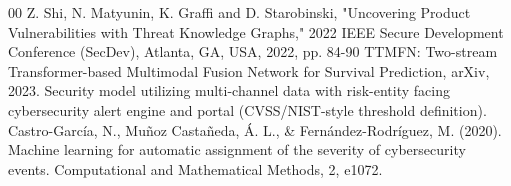 \documentclass[conference]{IEEEtran}
\begin{document}
\begin{thebibliography}{00}
Z. Shi, N. Matyunin, K. Graffi and D. Starobinski, "Uncovering Product Vulnerabilities with Threat Knowledge Graphs," 2022 IEEE Secure Development Conference (SecDev), Atlanta, GA, USA, 2022, pp. 84-90
TTMFN: Two-stream Transformer-based Multimodal Fusion Network for Survival Prediction, arXiv, 2023.
Security model utilizing multi-channel data with risk-entity facing cybersecurity alert engine and portal (CVSS/NIST-style threshold definition).
Castro-García, N., Muñoz Castañeda, Á. L., \& Fernández-Rodríguez, M. (2020). Machine learning for automatic assignment of the severity of cybersecurity events. Computational and Mathematical Methods, 2, e1072. 

\end{thebibliography}
\end{document}
